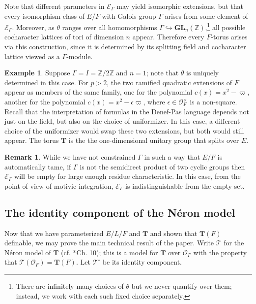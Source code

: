\documentclass{amsart}
\newcommand{\Z}{{\mathbb Z}}
\newcommand{\ri}{\mathcal{O}}
\newcommand{\GL}{\mathbf {GL}}
\newcommand{\bT}{\mathbf {T}}
\newcommand\cE{{\mathcal E}}
\newcommand{\Ner}[1]{\mathcal{#1}}
\newcommand{\NerC}[1]{\mathcal{#1}^\circ}
\theoremstyle{plain}
\theoremstyle{definition}
\newtheorem{rem}[thm]{Remark}
\newtheorem{example}[thm]{Example}
\begin{document}
Note that different parameters in $\cE_\Gamma$ may yield isomorphic extensions,
but that every isomorphism class of $E/F$ with Galois group $\Gamma$
arises from some element of $\cE_\Gamma$.  Moreover, as $\theta$ ranges over all homomorphisms
$\Gamma \hookrightarrow \GL_n(\Z)$,\footnote{There are infinitely many choices of $\theta$
but we never quantify over them; instead, we work with each such fixed choice separately.}
all possible cocharacter lattices of tori of dimension $n$ appear. Therefore every $F$-torus
arises via this construction, since it is determined by its splitting field and cocharacter lattice viewed as a $\Gamma$-module. 
\begin{example}
Suppose $\Gamma = I = \Z / 2\Z$ and $n=1$; note that $\theta$ is uniquely determined in this case.
For $p > 2$, the two ramified quadratic extensions of $F$ appear as members of the same family,
one for the polynomial $c(x) = x^2-\varpi$, another for the polynomial $c(x) = x^2-\epsilon\varpi$,
where $\epsilon \in \ri_F^\times$ is a non-square.
Recall that the interpretation of formulas in the Denef-Pas language depends not just on the field,
but also on the choice of uniformizer. In this case, a different choice of the uniformizer
would swap these two extensions, but both would still appear.
The torus $\bT$ is the the one-dimensional unitary group that splits over $E$.
\end{example}
\begin{rem}
While we have not constrained $\Gamma$ in such a way that $E/F$ is automatically tame,
if $\Gamma$ is not the semidirect product of two cyclic groups then
$\cE_\Gamma$ will be empty for large enough residue characteristic.  In this case, from the point of view
of motivic integration, $\cE_\Gamma$ is indistinguishable from the empty set.
\end{rem}

\subsection{The identity component of the N\'eron model} \label{sub:NerCdefinable}

Now that we have parameterized $E/L/F$ and $\bT$ and shown that $\bT(F)$ definable, we may prove the main technical result of the paper.
Write $\Ner{T}$ for the N\'eron model of $\bT$ (cf. \cite{bosch-lutkebohmert-reynaud:NeronModels}*{Ch. 10});
this is a model for $\bT$ over $\ri_F$ with the property that $\Ner{T}(\ri_F) = \bT(F)$.  Let $\NerC{T}$ be its identity component.
\end{document}
